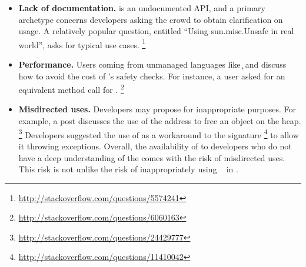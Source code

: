 \begin{itemize}
\item\textbf{Lack of documentation.}
\unsafe{} is an undocumented API,
and a primary archetype concerns developers asking the crowd to obtain clarification on usage.
A relatively popular question, entitled ``Using sun.misc.Unsafe in real world'',
asks for typical use cases.%
\footnote{\url{http://stackoverflow.com/questions/5574241}}

\item\textbf{Performance.}
Users coming from unmanaged languages like \c{} and \cpp{} discuss how to avoid the cost of \java{}'s safety checks.
For instance, a user asked for an equivalent method call for .%
\footnote{\url{http://stackoverflow.com/questions/6060163}}

\item \textbf{Misdirected uses.}
Developers may propose \unsafe{} for inappropriate purposes.
For example, a post discusses the use of the address to free an object on the \java{} heap.%
\footnote{\url{http://stackoverflow.com/questions/24429777}}
Developers suggested the use of \unsafe{} as a workaround to the  signature%
\footnote{\url{http://stackoverflow.com/questions/11410042}}
to allow it throwing exceptions.
Overall, the availability of \unsafe{} to developers who do not have a deep understanding of the \jvm{} comes with the risk of misdirected uses.
This risk is not unlike the risk of inappropriately using ~\cite{Richards:2011:EML:2032497.2032503} in \javascript{}.

\end{itemize}
